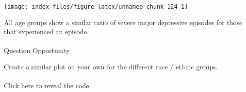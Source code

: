 \documentclass[
]{article}
\begin{document}
\begin{center}\texttt{[image: index\_files/figure-latex/unnamed-chunk-124-1]} \end{center}

All age groups show a similar ratio of severe major depressive episodes
for those that experienced an episode.

\hypertarget{section-38}{%
\paragraph{}\label{section-38}}

Question Opportunity

Create a similar plot on your own for the different race / ethnic
groups.

\hypertarget{section-39}{%
\paragraph{}\label{section-39}}

Click here to reveal the code.
\end{document}
